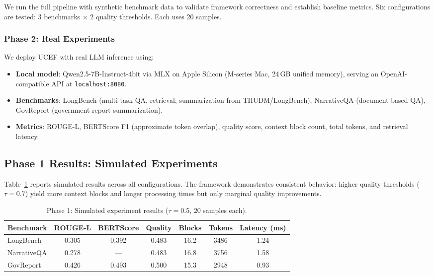 \documentclass[11pt,a4paper]{article}
\newcommand{\ucef}{\textsf{UCEF}}
\begin{document}
We run the full pipeline with synthetic benchmark data to validate framework
correctness and establish baseline metrics.  Six configurations are tested:
3 benchmarks $\times$ 2 quality thresholds.  Each uses 20 samples.

\subsubsection{Phase 2: Real Experiments}

We deploy \ucef{} with real LLM inference using:
\begin{itemize}
  \item \textbf{Local model}: Qwen2.5-7B-Instruct-4bit via MLX on Apple
    Silicon (M-series Mac, 24\,GB unified memory), serving an OpenAI-compatible
    API at \texttt{localhost:8080}.
  \item \textbf{Benchmarks}: LongBench (multi-task QA, retrieval,
    summarization from THUDM/LongBench), NarrativeQA (document-based QA),
    GovReport (government report summarization).
  \item \textbf{Metrics}: ROUGE-L, BERTScore F1 (approximate token overlap),
    quality score, context block count, total tokens, and retrieval latency.
\end{itemize}

\subsection{Phase 1 Results: Simulated Experiments}

Table~\ref{tab:simulated} reports simulated results across all
configurations.  The framework demonstrates consistent behavior: higher
quality thresholds ($\tau=0.7$) yield more context blocks and longer
processing times but only marginal quality improvements.

\begin{table}[t]
\caption{Phase 1: Simulated experiment results ($\tau=0.5$, 20 samples each).}
\label{tab:simulated}
\centering
\small
\begin{tabular}{@{}lcccccc@{}}
\toprule
Benchmark & ROUGE-L & BERTScore & Quality & Blocks & Tokens & Latency (ms) \\
\midrule
LongBench  & 0.305 & 0.392 & 0.483 & 16.2 & 3486 & 1.24 \\
NarrativeQA & 0.278 & ---    & 0.483 & 16.8 & 3756 & 1.58 \\
GovReport  & 0.426 & 0.493 & 0.500 & 15.3 & 2948 & 0.93 \\
\bottomrule
\end{tabular}
\end{table}
\end{document}

